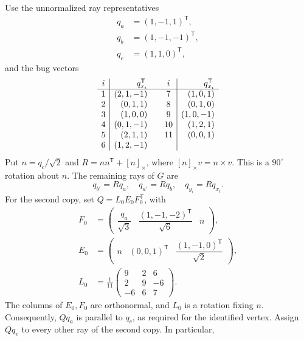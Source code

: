 \documentclass[aps,pra,reprint,superscriptaddress,longbibliography,nofootinbib,floatfix,10pt]{revtex4-2}
\theoremstyle{definition}\newtheorem{definition}[theorem]{Definition}
\theoremstyle{remark}\newtheorem{remark}[theorem]{Remark}
\begin{document}
Use the unnormalized ray representatives
\begin{equation}\label{eq:H53-initial-rays}
\begin{aligned}
q_a&=(1,-1,1)^{\mathsf T},\\
q_b&=(1,-1,-1)^{\mathsf T},\\
q_c&=(1,1,0)^{\mathsf T},
\end{aligned}
\end{equation}
and the bug vectors
\begin{equation}\label{eq:H53-bug-rays}
\begin{array}{c|r@{\qquad}c|r}
i&q_{x_i}^{\mathsf T}&i&q_{x_i}^{\mathsf T}\\\hline
1&(2,1,-1)&7&(1,0,1)\\
2&(0,1,1)&8&(0,1,0)\\
3&(1,0,0)&9&(1,0,-1)\\
4&(0,1,-1)&10&(1,2,1)\\
5&(2,1,1)&11&(0,0,1)\\
6&(1,2,-1)&&
\end{array}
\end{equation}
Put $n=q_c/\sqrt2$ and $R=nn^{\mathsf T}+[n]_\times$, where $[n]_\times v=n\times v$. This is a $90^\circ$ rotation about $n$. The remaining rays of $G$ are
\begin{equation}\label{eq:H53-rotated-rays}
q_{b'}=Rq_a,\quad q_{a'}=Rq_b,\quad q_{y_i}=Rq_{x_i}.
\end{equation}
For the second copy, set $Q=L_0E_0F_0^{\mathsf T}$, with
\begin{equation}\label{eq:H53-pasting-rotation}
\begin{aligned}
F_0&=\begin{pmatrix}\dfrac{q_a}{\sqrt3}&\dfrac{(1,-1,-2)^{\mathsf T}}{\sqrt6}&n\end{pmatrix},\\
E_0&=\begin{pmatrix}n&(0,0,1)^{\mathsf T}&\dfrac{(1,-1,0)^{\mathsf T}}{\sqrt2}\end{pmatrix},\\
L_0&=\frac1{11}\begin{pmatrix}9&2&6\\2&9&-6\\-6&6&7\end{pmatrix}.
\end{aligned}
\end{equation}
The columns of $E_0,F_0$ are orthonormal, and $L_0$ is a rotation fixing $n$. Consequently, $Qq_a$ is parallel to $q_c$, as required for the identified vertex. Assign $Qq_v$ to every other ray of the second copy. In particular,
\end{document}
